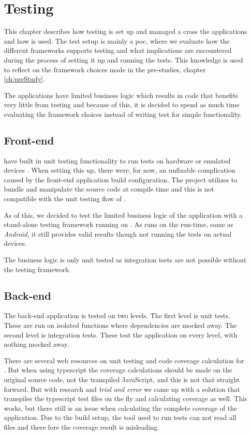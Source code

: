 \chapter{Testing}
This chapter describes how testing is set up and managed a cross the applications and how  is used.
The test setup is mainly a \gls{poc}, where we evaluate how the different frameworks supports testing and what implications are encountered during the process of setting it up and running the tests.
This knowledge is used to reflect on the framework choices made in the pre-studies, chapter \ref{ch:preStudy}.

The applications have limited business logic which results in code that benefits very little from testing and because of this, it is decided to spend as much time evaluating the framework choices instead of writing test for simple functionality.

\section{Front-end}
 have built in unit testing functionality to run tests on hardware or emulated devices \citep{testing:nativescript}.
When setting this up, there were, for now, an unfixable complication caused by the front-end application build configuration.
The project utilizes  to bundle and manipulate the source code at compile time and this is not compatible with the  unit testing flow of .

As of this, we decided to test the limited business logic of the application with a stand-alone testing framework running on .
As  runs on the  run-time, same as \textit{Android}, it still provides valid results though not running the tests on actual devices.

The business logic is only unit tested as integration tests are not possible without the  testing framework.

\section{Back-end}
The back-end application is tested on two levels.
The first level is unit tests.
These are run on isolated functions where dependencies are mocked away.
The second level is integration tests.
These test the application on every level, with nothing mocked away. 

There are several web resources on unit testing and code coverage calculation for .
But when using \gls{typescript} the coverage calculations should be made on the original source code, not the transpiled JavaScript, and this is not that straight forward.
But with research and \textit{trial and error} we came up with a solution that transpiles the \gls{typescript} test files on the fly and calculating coverage as well.
This works, but there still is an issue when calculating the complete coverage of the application.
Due to the build setup, the tool used to run tests can not read all files and there fore the coverage result is misleading.

